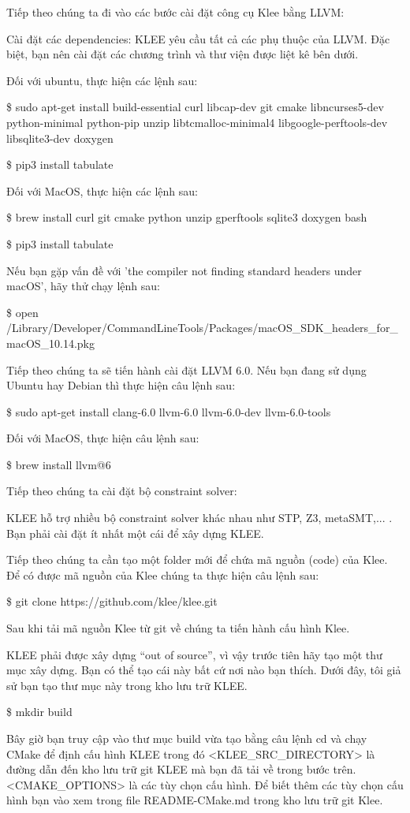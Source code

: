 \documentclass[12pt,a4paper]{article}
\begin{document}
Tiếp theo chúng ta đi vào các bước cài đặt công cụ Klee bằng LLVM:

Cài đặt các dependencies: KLEE yêu cầu tất cả các phụ thuộc của LLVM. Đặc biệt, bạn nên cài đặt các chương trình và thư viện được liệt kê bên dưới.

Đối với ubuntu, thực hiện các lệnh sau:

\$ sudo apt-get install build-essential curl libcap-dev git cmake libncurses5-dev python-minimal python-pip unzip libtcmalloc-minimal4 libgoogle-perftools-dev libsqlite3-dev doxygen

\$ pip3 install tabulate

Đối với MacOS, thực hiện các lệnh sau:

\$ brew install curl git cmake python unzip gperftools sqlite3 doxygen bash

\$ pip3 install tabulate

Nếu bạn gặp vấn đề với 'the compiler not finding standard headers under macOS', hãy thử chạy lệnh sau:

\$ open /Library/Developer/CommandLineTools/Packages/macOS\_SDK\_headers\_for\_macOS\_10.14.pkg

Tiếp theo chúng ta sẽ tiến hành cài đặt LLVM 6.0. Nếu bạn đang sử dụng Ubuntu hay Debian thì thực hiện câu lệnh sau:

\$ sudo apt-get install clang-6.0 llvm-6.0 llvm-6.0-dev llvm-6.0-tools

Đối với MacOS, thực hiện câu lệnh sau:

\$ brew install llvm@6

Tiếp theo chúng ta cài đặt bộ constraint solver:

KLEE hỗ trợ nhiều bộ constraint solver khác nhau như STP, Z3, metaSMT,... . Bạn phải cài đặt ít nhất một cái để xây dựng KLEE.

Tiếp theo chúng ta cần tạo một folder mới để chứa mã nguồn (code) của Klee. Để có được mã nguồn của Klee chúng ta thực hiện câu lệnh sau:

\$ git clone https://github.com/klee/klee.git

Sau khi tải mã nguồn Klee từ git về chúng ta tiến hành cấu hình Klee.

KLEE phải được xây dựng “out of source”, vì vậy trước tiên hãy tạo một thư mục xây dựng. Bạn có thể tạo cái này bất cứ nơi nào bạn thích. Dưới đây, tôi giả sử bạn tạo thư mục này trong kho lưu trữ KLEE.

\$ mkdir build

Bây giờ bạn truy cập vào thư mục build vừa tạo bằng câu lệnh cd và chạy CMake để định cấu hình KLEE trong đó <KLEE\_SRC\_DIRECTORY> là đường dẫn đến kho lưu trữ git KLEE mà bạn đã tải về trong bước trên. <CMAKE\_OPTIONS> là các tùy chọn cấu hình. Để biết thêm các tùy chọn cấu hình bạn vào xem trong file README-CMake.md trong kho lưu trữ git Klee.
\end{document}
